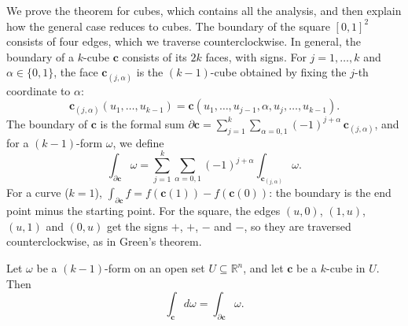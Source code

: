 We prove the theorem for cubes, which contains all the analysis, and then explain how the general case reduces to cubes. The boundary of the square $[0, 1]^2$ consists of four edges, which we traverse counterclockwise. In general, the boundary of a $k$-cube $\mathbf{c}$ consists of its $2k$ faces, with signs. For $j = 1, \ldots, k$ and $\alpha \in \{0, 1\}$, the face $\mathbf{c}_{(j, \alpha)}$ is the $(k - 1)$-cube obtained by fixing the $j$-th coordinate to $\alpha$:
\[\mathbf{c}_{(j, \alpha)}(u_1, \ldots, u_{k-1}) = \mathbf{c}(u_1, \ldots, u_{j-1}, \alpha, u_j, \ldots, u_{k-1}).\]
The boundary of $\mathbf{c}$ is the formal sum $\partial\mathbf{c} = \sum_{j=1}^k \sum_{\alpha = 0, 1} (-1)^{j+\alpha}\, \mathbf{c}_{(j, \alpha)}$, and for a $(k - 1)$-form $\omega$, we define
\[\int_{\partial\mathbf{c}} \omega = \sum_{j=1}^k \sum_{\alpha = 0, 1} (-1)^{j+\alpha} \int_{\mathbf{c}_{(j, \alpha)}} \omega.\]
For a curve ($k = 1$), $\int_{\partial\mathbf{c}} f = f(\mathbf{c}(1)) - f(\mathbf{c}(0))$: the boundary is the end point minus the starting point. For the square, the edges $(u, 0)$, $(1, u)$, $(u, 1)$ and $(0, u)$ get the signs $+$, $+$, $-$ and $-$, so they are traversed counterclockwise, as in Green's theorem.

\begin{theorem}\label{A-thm:stokes-cube}
    Let $\omega$ be a $(k - 1)$-form on an open set $U \subseteq \mathbb{R}^n$, and let $\mathbf{c}$ be a $k$-cube in $U$. Then
    \[\int_{\mathbf{c}} d\omega = \int_{\partial\mathbf{c}} \omega.\]
\end{theorem}

